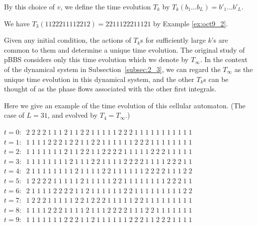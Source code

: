 \documentclass[11pt]{article}
\begin{document}
By this choice of $v$, we def\/ine the time evolution $T_k$ by
$T_k (b_1 \dots b_L) = b'_1 \dots  b'_L$.
\begin{example}
We have
$T_3 (1122211112212) = 2211122211121$ by Example \ref{ex:oct9_2}.
\end{example}

\begin{remark}\label{rem:may19_1}
Given any initial condition,
the actions of $T_k$s for suf\/f\/iciently large $k$'s are common to them and determine a unique time evolution.
The original study of pBBS \cite{YT, YYT} considers only this time evolution which we denote by $T_\infty$.
{In the context of the dynamical system in Subsection~\ref{subsec:2_3},
we can regard the $T_\infty$ as the unique time evolution in this dynamical system, and the other $T_k$s can be thought of as the phase f\/lows
associated with the other f\/irst integrals.}
\end{remark}


Here we give an example of the time evolution of this cellular automaton. (The case of $L=31$, and evolved by $T_4=T_\infty$.)

\begin{center}
$t=0: \;\;2\; 2\; 2\; 2\; 1\; 1\; 1\; 2\; 1\; 1\; 2\; 2\; 1\; 1\; 1\; 1\; 1\; 2\; 2\; 2\; 1\; 1\; 1\; 1\; 1\; 1\; 1\; 1\; 1\; 1\; 1$\\
$t=1: \;\;1\; 1\; 1\; 1\; 2\; 2\; 2\; 1\; 2\; 2\; 1\; 1\; 2\; 2\; 1\; 1\; 1\; 1\; 1\; 1\; 2\; 2\; 2\; 1\; 1\; 1\; 1\; 1\; 1\; 1\; 1$\\
$t=2: \;\;1\; 1\; 1\; 1\; 1\; 1\; 1\; 2\; 1\; 1\; 2\; 2\; 1\; 1\; 2\; 2\; 2\; 2\; 1\; 1\; 1\; 1\; 1\; 2\; 2\; 2\; 1\; 1\; 1\; 1\; 1$\\
$t=3: \;\;1\; 1\; 1\; 1\; 1\; 1\; 1\; 1\; 2\; 1\; 1\; 1\; 2\; 2\; 1\; 1\; 1\; 1\; 2\; 2\; 2\; 2\; 1\; 1\; 1\; 1\; 2\; 2\; 2\; 1\; 1$\\
$t=4: \;\;2\; 1\; 1\; 1\; 1\; 1\; 1\; 1\; 1\; 2\; 1\; 1\; 1\; 1\; 2\; 2\; 1\; 1\; 1\; 1\; 1\; 1\; 2\; 2\; 2\; 2\; 1\; 1\; 1\; 2\; 2$\\
$t=5: \;\;1\; 2\; 2\; 2\; 2\; 1\; 1\; 1\; 1\; 1\; 2\; 1\; 1\; 1\; 1\; 1\; 2\; 2\; 1\; 1\; 1\; 1\; 1\; 1\; 1\; 1\; 2\; 2\; 2\; 1\; 1$\\
$t=6: \;\;2\; 1\; 1\; 1\; 1\; 2\; 2\; 2\; 2\; 1\; 1\; 2\; 1\; 1\; 1\; 1\; 1\; 1\; 2\; 2\; 1\; 1\; 1\; 1\; 1\; 1\; 1\; 1\; 1\; 2\; 2$\\
$t=7: \;\;1\; 2\; 2\; 2\; 1\; 1\; 1\; 1\; 1\; 2\; 2\; 1\; 2\; 2\; 2\; 1\; 1\; 1\; 1\; 1\; 2\; 2\; 1\; 1\; 1\; 1\; 1\; 1\; 1\; 1\; 1$\\
$t=8: \;\;1\; 1\; 1\; 1\; 2\; 2\; 2\; 1\; 1\; 1\; 1\; 2\; 1\; 1\; 1\; 2\; 2\; 2\; 2\; 1\; 1\; 1\; 2\; 2\; 1\; 1\; 1\; 1\; 1\; 1\; 1$\\
$t=9: \;\;1\; 1\; 1\; 1\; 1\; 1\; 1\; 2\; 2\; 2\; 1\; 1\; 2\; 1\; 1\; 1\; 1\; 1\; 1\; 2\; 2\; 2\; 1\; 1\; 2\; 2\; 2\; 1\; 1\; 1\; 1$
\end{center}
\end{document}
